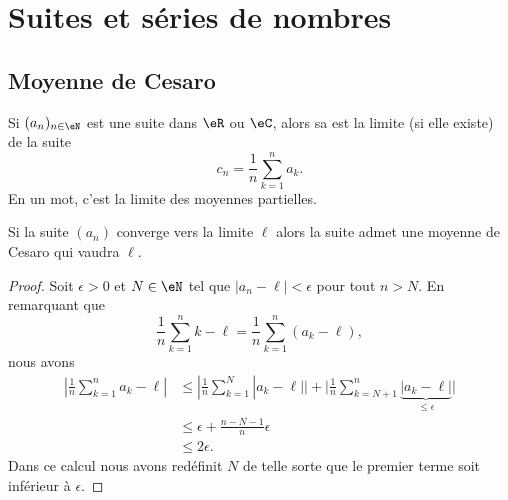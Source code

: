 \section{Suites et séries de nombres}

\subsection{Moyenne de Cesaro}

Si \( (a_n)_{n\in \eN} \) est une suite dans \( \eR\) ou \( \eC\), alors sa  est la limite (si elle existe) de la suite
\begin{equation}
    c_n=\frac{1}{ n }\sum_{k=1}^na_k.
\end{equation}
En un mot, c'est la limite des moyennes partielles.

\begin{lemma}       \label{LemyGjMqM}
    Si la suite \( (a_n)\) converge vers la limite \( \ell\) alors la suite admet une moyenne de Cesaro qui vaudra \( \ell\).
\end{lemma}

\begin{proof}
    Soit \( \epsilon>0\) et \( N\in \eN\) tel que \( | a_n-\ell |<\epsilon\) pour tout \( n>N\). En remarquant que
    \begin{equation}
        \frac{1}{ n }\sum_{k=1}^nk-\ell=\frac{1}{ n }\sum_{k=1}^n(a_k-\ell),
    \end{equation}
    nous avons
    \begin{subequations}
        \begin{align}
            | \frac{1}{ n }\sum_{k=1}^na_k-\ell |&\leq| \frac{1}{ n }\sum_{k=1}^N| a_k-\ell | |+\big| \frac{1}{ n }\sum_{k=N+1}^n\underbrace{| a_k-\ell |}_{\leq \epsilon} \big|\\
            &\leq \epsilon+\frac{ n-N-1 }{ n }\epsilon\\
            &\leq 2\epsilon.
        \end{align}
    \end{subequations}
    Dans ce calcul nous avons redéfinit \( N\) de telle sorte que le premier terme soit inférieur à \( \epsilon\).
\end{proof}



